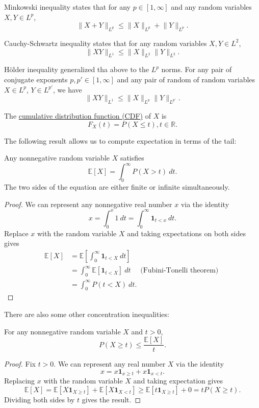 Minkowski inequality states that for any $p \in [1, \infty]$ and any random variables $X, Y \in L^p$, 
\[ \lVert X + Y \rVert_{L^p} \leq \lVert X \rVert_{L^p} + \lVert Y \rVert_{L^p}. \]

Cauchy-Schwartz inequality states that for any random variables $X, Y \in L^2$, 
\[ \lVert XY \rVert_{L^1} \leq \lVert X \rVert_{L^2} \lVert Y \rVert_{L^2}. \]

Hölder inequality generalized tha above to the $L^p$ norms. For any pair of conjugate exponents 
$p, p' \in [1, \infty]$ and any pair of random of random variables $X \in L^p$, $Y \in L^{p'}$, we have 
\[ \lVert XY \rVert_{L^1} \leq \lVert X \rVert_{L^p} \lVert Y \rVert_{L^{p'}}. \]

The \underline{cumulative distribution function (CDF)} of $X$ is 
\[ F_X(t) = P(X \leq t), t \in \mathbb{R}. \]

The following result allows us to compute expectation in terms of the tail:
\begin{lemma}
\label{lem:1.6.1}
Any nonnegative random variable $X$ satisfies 
\[ \mathbb{E}[X] = \int_{0}^{\infty} P(X > t) \ dt. \]
The two sides of the equation are either finite or infinite simultaneously.
\end{lemma}

\begin{proof}
We can represent any nonnegative real number $x$ via the identity 
\[ x = \int_{0}^{x} 1 \ dt = \int_{0}^{\infty} \mathbf{1}_{t < x} \ dt. \]
Replace $x$ with the random variable $X$ and taking expectations on both sides gives
\begin{align*}
	\mathbb{E}[X] 
	&= \mathbb{E}\left[ \int_{0}^{\infty} \mathbf{1}_{t < X} \ dt \right] \\
	&= \int_{0}^{\infty} \mathbb{E}[\mathbf{1}_{t < X}] \ dt \quad \text{ (Fubini-Tonelli theorem) }  \\
	&=\int_{0}^{\infty} P(t < X) \ dt.
\end{align*}
\end{proof}

There are also some other concentration inequalities: 
\begin{proposition}
For any nonnegative random variable $X$ and $t > 0$, 
\[ P(X \geq t) \leq \frac{\mathbb{E}[X]}{t}. \]
\end{proposition}

\begin{proof}
Fix $t > 0$. We can represent any real number $X$ via the identity 
\[ x = x \mathbf{1}_{x \geq t} + x \mathbf{1}_{x < t}. \]
Replacing $x$ with the random variable $X$ and taking expectation gives 
\[ \mathbb{E}[X] = \mathbb{E}[X \mathbf{1}_{X \geq t}] + \mathbb{E}[X \mathbf{1}_{X < t}] 
\geq \mathbb{E}[t \mathbf{1}_{X \geq t}] + 0 = t P(X \geq t). \]
Dividing both sides by $t$ gives the result.
\end{proof}


